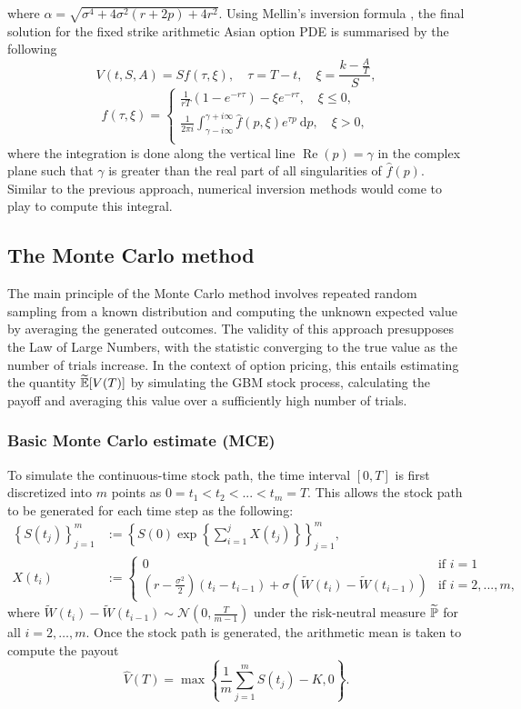 where \(\alpha=\sqrt{\sigma^4+4 \sigma^2(r+2 p)+4 r^2}\). Using Mellin's inversion formula \cite{mclachlan1953complex}, the final solution for the fixed strike arithmetic Asian option PDE is summarised by the following
\[
    V(t, S, A)=S f(\tau, \xi), \quad \tau=T-t, \quad \xi=\frac{k-\frac{A}{T}}{S},
\]
\[
f(\tau, \xi) = \begin{cases}
    \displaystyle \frac{1}{r T}\left(1-e^{-r \tau}\right)-\xi e^{-r \tau}, \quad \xi \leqslant 0, \\
    \displaystyle \frac{1}{2 \pi i} \int_{\gamma-i \infty}^{\gamma+i \infty} \hat{f}(p, \xi) e^{\tau p} \mathrm{~d} p, \quad \xi>0,\\
\end{cases}
\]
where the integration is done along the vertical line \(\operatorname{Re}(p)=\gamma\) in the complex plane such that \(\gamma\) is greater than the real part of all singularities of \(\hat{f}(p)\). Similar to the previous approach, numerical inversion methods would come to play to compute this integral.

\subsection{The Monte Carlo method}

The main principle of the Monte Carlo method involves repeated random sampling from a known distribution and computing the unknown expected value by averaging the generated outcomes.
The validity of this approach presupposes the Law of Large Numbers, with the statistic converging to the true value as the number of trials increase.
In the context of option pricing, this entails estimating the quantity $\widetilde{\mathbb{E}}[V(T)]$ by simulating the GBM stock process, calculating the payoff and averaging this value over a sufficiently high number of trials.

\subsubsection{Basic Monte Carlo estimate (MCE)}

To simulate the continuous-time stock path, the time interval $[0, T]$ is first discretized into $m$ points as $0 = t_1 < t_2 < ... < t_m = T$. This allows the stock path to be generated for each time step as the following:
\begin{align*}
\left\{S(t_j)\right\}_{j=1}^{m} & := \left\{S(0)\exp\left\{\sum_{i=1}^jX(t_j)\right\}\right\}_{j=1}^{m},\\
X(t_i) & := \begin{cases}
    0 & \text{if } i = 1\\
    \left(r - \frac{\sigma^2}{2}\right)\left(t_{i}-t_{i-1}\right) + \sigma\left(\widetilde{W}(t_i) - \widetilde{W}(t_{i-1})\right) & \text{if } i = 2, ..., m,
\end{cases}
\end{align*}
where $\widetilde{W}(t_i) - \widetilde{W}(t_{i-1}) \sim \mathcal{N}\left(0, \frac{T}{m-1}\right)$ under the risk-neutral measure $\widetilde{\mathbb{P}}$ for all $i=2,\dots,m$.
Once the stock path is generated, the arithmetic mean is taken to compute the payout
$$\widehat{V}(T) = \max \left\{\frac{1}{m} \sum_{j=1}^m S\left(t_j\right) - K, 0 \right\}.$$

